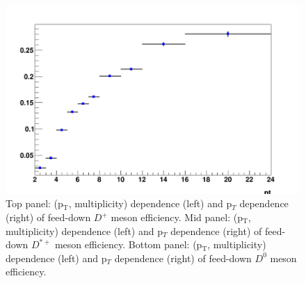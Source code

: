 \begin{figure}[h]
	\includegraphics[width=.48\linewidth]{figures/Effs/EfficiencyMap_1D_Dzero_b_Ref_wLimAcc_Plot.png}
	\caption{Top panel: (p$_\mathrm{T}$, multiplicity) dependence (left) and p$_T$ dependence (right) of feed-down $D^{+}$ meson efficiency.
Mid panel: (p$_\mathrm{T}$, multiplicity) dependence (left) and p$_T$ dependence (right) of feed-down $D^{*+}$ meson efficiency.
Bottom panel: (p$_\mathrm{T}$, multiplicity) dependence (left) and p$_T$ dependence (right) of feed-down $D^{0}$ meson efficiency.}
	\label{fig:dEffFD}	
\end{figure}
\clearpage
